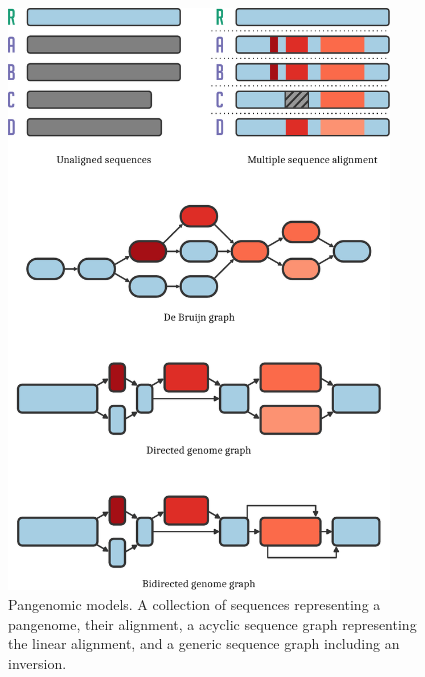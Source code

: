 \begin{figure}[p]
    \includegraphics[width=0.9\textwidth]{figures/data_structures.pdf}
    \caption{\label{fig:models} Pangenomic models.
      A collection of sequences representing a pangenome, their alignment, a acyclic sequence graph representing the linear alignment, and a generic sequence graph including an inversion.
    }
\end{figure}

